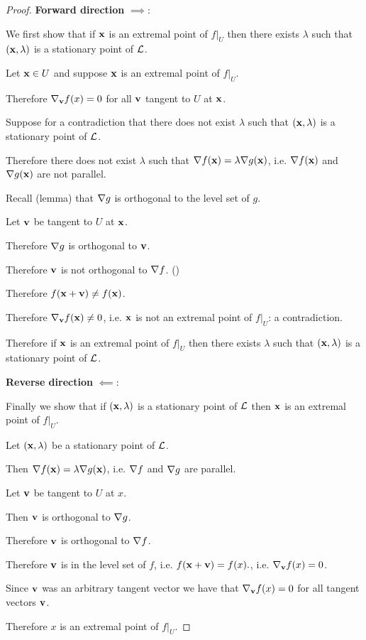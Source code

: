 \begin{proof}
  {\bf Forward direction} $\implies$:

  We first show that if $\mathbf x$ is an extremal point of $f|_U$ then there exists $\lambda$ such
  that $(\mathbf x, \lambda)$ is a stationary point of $\mathcal{L}$.

  Let $\mathbf x \in U$ and suppose $\mathbf x$ is an extremal point of $f|_U$.

  Therefore $\nabla_{\mathbf v}f(x) = 0$ for all $\mathbf v$ tangent to $U$ at $\mathbf x$.

  Suppose for a contradiction that there does not exist $\lambda$ such that $(\mathbf x, \lambda)$ is a
  stationary point of $\mathcal{L}$.

  Therefore there does not exist $\lambda$ such that $\nabla f(\mathbf x) = \lambda \nabla g(\mathbf x)$,
  i.e. $\nabla f(\mathbf x)$ and $\nabla g(\mathbf x)$ are not parallel.

  Recall (lemma) that $\nabla g$ is orthogonal to the level set of $g$.

  Let $\mathbf v$ be tangent to $U$ at $\mathbf x$.

  Therefore $\nabla g$ is orthogonal to $\mathbf v$.

  Therefore $\mathbf v$ is not orthogonal to $\nabla f$. ()

  Therefore $f(\mathbf x + \mathbf v) \neq f(\mathbf x)$.

  Therefore $\nabla_\mathbf v f(\mathbf x) \neq 0$, i.e. $\mathbf x$ is not an extremal point of $f|_U$: a contradiction.

  Therefore if $\mathbf x$ is an extremal point of $f|_U$ then there exists $\lambda$ such that $(\mathbf x, \lambda)$ is a stationary point of $\\\mathcal{L}$.

  {\bf Reverse direction} $\impliedby$:

  Finally we show that if $(\mathbf x, \lambda)$ is a stationary point of $\mathcal{L}$ then $\mathbf x$ is an extremal point of $f|_U$.

  Let $(\mathbf x, \lambda)$ be a stationary point of $\mathcal{L}$.

  Then $\nabla f(\mathbf x) = \lambda\nabla g(\mathbf x)$, i.e. $\nabla f$ and $\nabla g$ are parallel.

  Let $\mathbf v$ be tangent to $U$ at $x$.

  Then $\mathbf v$ is orthogonal to $\nabla g$.

  Therefore $\mathbf v$ is orthogonal to $\nabla f$.

  Therefore $\mathbf v$ is in the level set of $f$, i.e. $f(\mathbf x + \mathbf v) = f(x).$, i.e. $\nabla_\mathbf v f(x) = 0$.

  Since $\mathbf v$ was an arbitrary tangent vector we have that $\nabla_\mathbf v f(x) = 0$ for all tangent vectors $\mathbf v$.

  Therefore $x$ is an extremal point of $f|_U$.
\end{proof}


